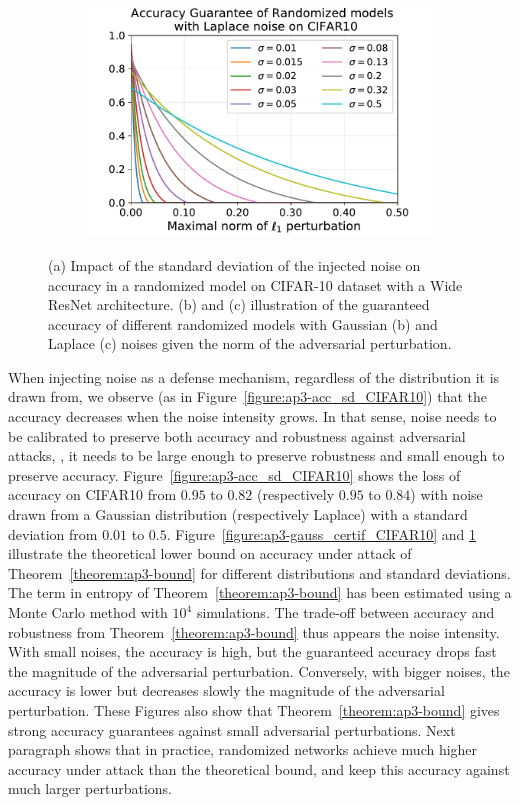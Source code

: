 \begin{figure}[htb]
\begin{subfigure}[t]{0.31\textwidth}
      \includegraphics[scale=0.32]{figures/appendix/ap3-randomized_inference/laplace_certif_CIFAR10.pdf}
      \caption{}
      \label{figure:ap3-laplace_certif_CIFAR10}
  \end{subfigure}
  \caption{(a) Impact of the standard deviation of the injected noise on accuracy in a randomized model on CIFAR-10 dataset with a Wide ResNet architecture. (b) and (c) illustration of the guaranteed accuracy of different randomized models with Gaussian (b) and Laplace (c) noises given the norm of the adversarial perturbation.}
  \label{figure:ap3-cifar10_results}
\end{figure}

When injecting noise as a defense mechanism, regardless of the distribution it is drawn from, we observe (as in Figure~\ref{figure:ap3-acc_sd_CIFAR10}) that the accuracy decreases when the noise intensity grows.
In that sense, noise needs to be calibrated to preserve both accuracy and robustness against adversarial attacks, \ie, it needs to be large enough to preserve robustness and small enough to preserve accuracy.
Figure~\ref{figure:ap3-acc_sd_CIFAR10} shows the loss of accuracy on CIFAR10 from $0.95$ to $0.82$ (respectively $0.95$ to $0.84$) with noise drawn from a Gaussian distribution (respectively Laplace) with a standard deviation from $0.01$ to $0.5$.
Figure~\ref{figure:ap3-gauss_certif_CIFAR10} and \ref{figure:ap3-laplace_certif_CIFAR10} illustrate the theoretical lower bound on accuracy under attack of Theorem~\ref{theorem:ap3-bound} for different distributions and standard deviations.
The term in entropy of Theorem~\ref{theorem:ap3-bound} has been estimated using a Monte Carlo method with $10^4$ simulations.
The trade-off between accuracy and robustness from Theorem~\ref{theorem:ap3-bound} thus appears \wrt the noise intensity.
With small noises, the accuracy is high, but the guaranteed accuracy drops fast \wrt the magnitude of the adversarial perturbation.
Conversely, with bigger noises, the accuracy is lower but decreases slowly \wrt the magnitude of the adversarial perturbation.
These Figures also show that Theorem~\ref{theorem:ap3-bound} gives strong accuracy guarantees against small adversarial perturbations.
Next paragraph shows that in practice, randomized networks achieve much higher accuracy under attack than the theoretical bound, and keep this accuracy against much larger perturbations.



